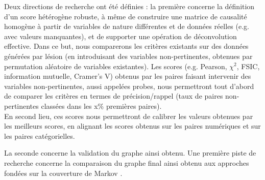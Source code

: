 \documentclass[11pt,fleqn,openany,frenchb]{book} %
\begin{document}
Deux directions de recherche ont été définies : la première concerne la définition d'un score hétérogène robuste, à même de construire une matrice de causalité homogène à partir de variables de nature différentes et de données réelles (e.g. avec valeurs manquantes), et de supporter une opération de déconvolution effective. Dans ce but, nous comparerons les critères existants sur des données générées par lésion (en introduisant des variables non-pertinentes, obtenues par permutation aléatoire de variables existantes). Les scores (e.g. Pearson, $\chi^2$, FSIC, information mutuelle, Cramer's V) obtenus par les paires faisant intervenir des variables non-pertinentes, aussi appelées probes, nous permettront tout d'abord de comparer les critères en termes de précision/rappel (taux de paires non-pertinentes classées dans les x\% premières paires). \\
En second lieu, ces scores nous permettront de calibrer les valeurs obtenues par les meilleurs scores, en alignant les scores obtenus sur les paires numériques et sur les paires catégorielles.

La seconde concerne la validation du graphe ainsi obtenu. Une première piste de recherche concerne la comparaison du graphe final ainsi obtenu aux approches fondées sur la couverture de Markov \cite{aliferis2010local}.








\listoffigures
{}

\listoftables
{}
\vfill
\end{document}

